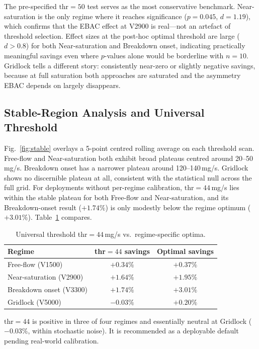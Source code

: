 \documentclass[review,3p,authoryear,times]{elsarticle}
\begin{document}
The pre-specified $\text{thr}=50$ test serves as the most conservative
benchmark. Near-saturation is the only regime where it reaches significance
($p=0.045$, $d=1.19$), which confirms that the EBAC effect at V2900 is
real---not an artefact of threshold selection. Effect sizes at the post-hoc
optimal threshold are large ($d>0.8$) for both Near-saturation and
Breakdown onset, indicating practically meaningful savings even where
$p$-values alone would be borderline with $n=10$. Gridlock tells a
different story: consistently near-zero or slightly negative savings, because
at full saturation both approaches are saturated and the asymmetry EBAC
depends on largely disappears.

\subsection{Stable-Region Analysis and Universal Threshold}
\label{sec:stable}

Fig.~\ref{fig:stable} overlays a 5-point centred rolling average on each
threshold scan. Free-flow and Near-saturation both exhibit broad plateaus
centred around 20--50\,mg/s. Breakdown onset has a narrower plateau around
120--140\,mg/s. Gridlock shows no discernible plateau at all, consistent
with the statistical null across the full grid. For deployments without
per-regime calibration, $\text{thr}=44$\,mg/s lies within the stable
plateau for both Free-flow and Near-saturation, and its Breakdown-onset
result ($+1.74\%$) is only modestly below the regime optimum ($+3.01\%$).
Table~\ref{tab:universal} compares.

\begin{table}[H]
  \centering
  \caption{Universal threshold thr$=44$\,mg/s vs.\ regime-specific optima.}
  \label{tab:universal}
  \begin{tabular}{lcc}
    \toprule
    \textbf{Regime} & \textbf{thr$=44$ savings} & \textbf{Optimal savings} \\
    \midrule
    Free-flow (V1500)       & $+0.34\%$ & $+0.37\%$ \\
    Near-saturation (V2900) & $+1.64\%$ & $+1.95\%$ \\
    Breakdown onset (V3300) & $+1.74\%$ & $+3.01\%$ \\
    Gridlock (V5000)        & $-0.03\%$ & $+0.20\%$ \\
    \bottomrule
  \end{tabular}
\end{table}

$\text{thr}=44$ is positive in three of four regimes and essentially neutral
at Gridlock ($-0.03\%$, within stochastic noise). It is recommended as a
deployable default pending real-world calibration.
\end{document}
